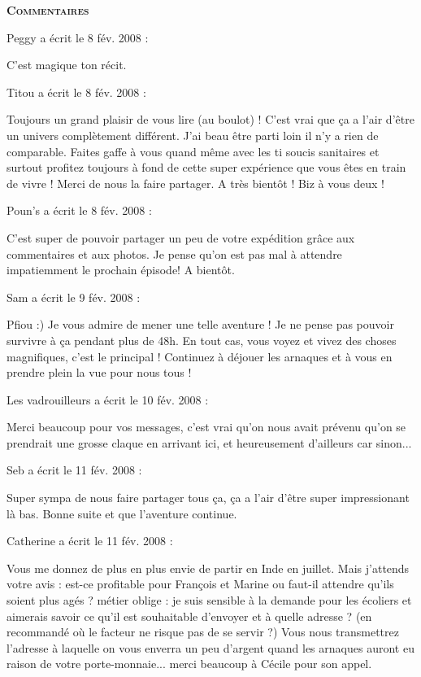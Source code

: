 \bigskip
\textbf{\textsc{Commentaires}}

\medskip
Peggy a écrit le 8 fév. 2008 :
\begin{displayquote}
C'est magique ton récit.
\end{displayquote}

\medskip
Titou a écrit le 8 fév. 2008 :
\begin{displayquote}
Toujours un grand plaisir de vous lire (au boulot) ! C'est vrai que ça a l'air d'être un univers complètement différent. J'ai beau être parti loin il n'y a rien de comparable. Faites gaffe à vous quand même avec les ti soucis sanitaires et surtout profitez toujours à fond de cette super expérience que vous êtes en train de vivre ! Merci de nous la faire partager. A très bientôt ! Biz à vous deux !
\end{displayquote}

\medskip
Poun's a écrit le 8 fév. 2008 :
\begin{displayquote}
C'est super de pouvoir partager un peu de votre expédition grâce aux commentaires et aux photos. Je pense qu'on est pas mal à attendre impatiemment le prochain épisode!
A bientôt.
\end{displayquote}

\medskip
Sam a écrit le 9 fév. 2008 :
\begin{displayquote}
Pfiou :) Je vous admire de mener une telle aventure ! Je ne pense pas pouvoir survivre à ça pendant plus de 48h.
En tout cas, vous voyez et vivez des choses magnifiques, c'est le principal ! Continuez à déjouer les arnaques et à vous en prendre plein la vue pour nous tous !
\end{displayquote}

\medskip
Les vadrouilleurs a écrit le 10 fév. 2008 :
\begin{displayquote}
Merci beaucoup pour vos messages, c'est vrai qu'on nous avait prévenu qu'on se prendrait une grosse claque en arrivant ici, et heureusement d'ailleurs car sinon...
\end{displayquote}

\medskip
Seb a écrit le 11 fév. 2008 :
\begin{displayquote}
Super sympa de nous faire partager tous ça, ça a l'air d'être super impressionant là bas.
Bonne suite et que l'aventure continue.
\end{displayquote}

\medskip
Catherine a écrit le 11 fév. 2008 :
\begin{displayquote}
Vous me donnez de plus en plus envie de partir en Inde en juillet. Mais j'attends votre avis : est-ce profitable pour François et Marine ou faut-il attendre qu'ils soient plus agés ?
métier oblige : je suis sensible à la demande pour les écoliers et aimerais savoir ce qu'il est souhaitable d'envoyer et à quelle adresse ? (en recommandé où le facteur ne risque pas de se servir ?)
Vous nous transmettrez l'adresse à laquelle on vous enverra un peu d'argent quand les arnaques auront eu raison de votre porte-monnaie...
merci beaucoup à Cécile pour son appel.
\end{displayquote}

